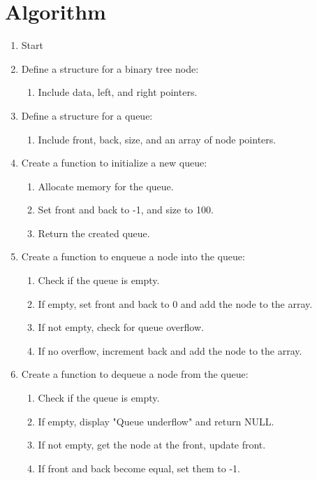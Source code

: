 
\section*{Algorithm}

\begin{enumerate}[label=\arabic*.]
    \item Start
    
    \item Define a structure for a binary tree node:
    \begin{enumerate}[label=\arabic{enumi}.\arabic*.]
        \item Include data, left, and right pointers.
    \end{enumerate}
    
    \item Define a structure for a queue:
    \begin{enumerate}[label=\arabic{enumi}.\arabic*.]
        \item Include front, back, size, and an array of node pointers.
    \end{enumerate}
    
    \item Create a function to initialize a new queue:
    \begin{enumerate}[label=\arabic{enumi}.\arabic*.]
        \item Allocate memory for the queue.
        \item Set front and back to -1, and size to 100.
        \item Return the created queue.
    \end{enumerate}
    
    \item Create a function to enqueue a node into the queue:
    \begin{enumerate}[label=\arabic{enumi}.\arabic*.]
        \item Check if the queue is empty.
        \item If empty, set front and back to 0 and add the node to the array.
        \item If not empty, check for queue overflow.
        \item If no overflow, increment back and add the node to the array.
    \end{enumerate}
    
    \item Create a function to dequeue a node from the queue:
    \begin{enumerate}[label=\arabic{enumi}.\arabic*.]
        \item Check if the queue is empty.
        \item If empty, display "Queue underflow" and return NULL.
        \item If not empty, get the node at the front, update front.
        \item If front and back become equal, set them to -1.
    \end{enumerate}
    

\end{enumerate}
